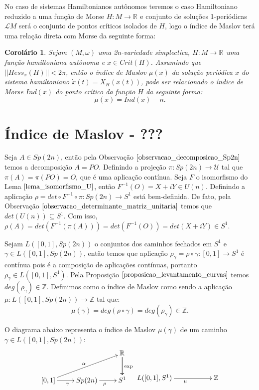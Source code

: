 \documentclass[12pt]{book}
\newtheorem{corolario}[teorema]{Corolário}
\newcommand{\caminhosfechadoscirculo}[2]{L([#1,#2], S^{1})}
\newcommand{\caminhosfechadosSp}[2]{L([#1,#2], \gruposimpletico{2n})}
\newcommand{\gruposimpletico}[1]{Sp(#1)}
\newcommand{\inteiros}{\mathbb{Z}}
\newcommand{\matrizSimpleticaOrtogonal}{\mathcal{U}}
\newcommand{\matrizunitaria}[1]{U(#1)}
\newcommand{\real}[1]{\mathbb{R}^{#1}}
\newcommand{\solucoesperiodicascontrateis}{\mathcal{L}M}
\begin{document}
	No caso de sistemas Hamiltonianos autônomos teremos o caso Hamiltoniano reduzido a uma função de Morse $H:M\to \real{}$ e conjunto de soluções 1-periódicas $\solucoesperiodicascontrateis$ será o conjunto de pontos críticos isolados de $H$, logo o índice de Maslov terá uma relação direta com Morse da seguinte forma:
	
	\begin{corolario}
		Sejam $(M, \omega)$ uma 2n-variedade simplectica, $H : M \to \real{}$ uma função hamiltoniana autônoma e $x \in Crit(H)$. Assumindo que $||Hess_{x}(H)|| < 2\pi$, então o índice de Maslov $\mu(x)$ da solução periódica $x$ do sistema hamiltoniano $\dot{x}(t) = X_{H}(x(t))$, pode ser relacionado o índice de Morse $Ind(x)$ do ponto crítico da função $H$ da seguinte forma:
		$$
		\mu(x) = Ind(x) - n.
		$$
	\end{corolario}	
	
	
	
	\chapter{Índice de Maslov - ???}
	Seja $A\in \gruposimpletico{2n}$, então pela Observação $\ref{observacao_decomposicao_Sp2n}$ temos a decomposição $A=PO$. Definindo a projeção $\pi:\gruposimpletico{2n}\to \matrizSimpleticaOrtogonal$ tal que $\pi(A) = \pi(PO) = O$, que é uma aplicação contínua. Seja $F$ o isomorfismo do Lema $\ref{lema_isomorfismo_U}$, então $F^{-1}(O) = X+iY \in \matrizunitaria{n}$. Definindo a aplicação $\rho = det\circ F^{-1}\circ \pi :\gruposimpletico{2n} \to S^{1}$ está bem-definida. De fato, pela Observação $\ref{observacao_determinante_matriz_unitaria}$ temos que $det(\matrizunitaria{n}) \subseteq S^{1}$. Com isso, $\rho(A) = det(F^{-1}(\pi(A))) = det(F^{-1}(O)) = det(X+iY) \in S^{1}$.
	
	Sejam $\caminhosfechadosSp{0}{1}$ o conjuntos dos caminhos fechados em $S^{1}$ e $\gamma \in \caminhosfechadosSp{0}{1}$, então temos que aplicação $\rho_{\gamma}=\rho\circ \gamma:[0,1] \to S^{1}$ é contínua pois é a composição de aplicações contínuas, portanto $\rho_{\gamma} \in \caminhosfechadoscirculo{0}{1}$. Pela Proposição $\ref{proposicao_levantamento_curvas}$ temos $deg(\rho_{\gamma}) \in \inteiros$. Definimos como o índice de Maslov como sendo a aplicação $\mu:\caminhosfechadosSp{0}{1} \to \inteiros$ tal que:
	$$
	\mu(\gamma) = deg(\rho \circ \gamma) = deg(\rho_{\gamma}) \in \inteiros.
	$$

	O diagrama abaixo representa o índice de Maslov $\mu(\gamma)$ de um caminho $\gamma \in \caminhosfechadosSp{0}{1}$:
	$$
	\xymatrix{
		& & \real{}\ar[d]\ar[d]^{\text{exp}}
		\\
		[0,1 ]\ar[urr]^{\alpha} \ar[r]_{\gamma} & Sp(2n) \ar[r]_{\rho} & S^{1}
	}
	\xymatrix{
		& &
		\\
		\caminhosfechadoscirculo{0}{1}\ar[rr]_{\mu} & & \inteiros 
	}
	$$
\end{document}
